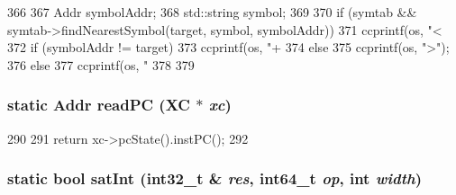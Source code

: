 \begin{DoxyCode}
366 {
367     Addr symbolAddr;
368     std::string symbol;
369 
370     if (symtab && symtab->findNearestSymbol(target, symbol, symbolAddr)) {
371         ccprintf(os, "<%
372         if (symbolAddr != target)
373             ccprintf(os, "+%
374         else
375             ccprintf(os, ">");
376     } else {
377         ccprintf(os, "%
378     }
379 }
\end{DoxyCode}
\hypertarget{classArmISA_1_1ArmStaticInst_a8895f5e6ea72acdc881a4a2811d8061d}{
\subsubsection[{readPC}]{\setlength{\rightskip}{0pt plus 5cm}static {\bf Addr} readPC (XC $\ast$ {\em xc})}}
\label{classArmISA_1_1ArmStaticInst_a8895f5e6ea72acdc881a4a2811d8061d}



\begin{DoxyCode}
290     {
291         return xc->pcState().instPC();
292     }
\end{DoxyCode}
\hypertarget{classArmISA_1_1ArmStaticInst_acd2842ccffb92bb276c016c87155bc67}{
\subsubsection[{satInt}]{\setlength{\rightskip}{0pt plus 5cm}static bool satInt (int32\_\-t \& {\em res}, \/  int64\_\-t {\em op}, \/  int {\em width})}}
\label{classArmISA_1_1ArmStaticInst_acd2842ccffb92bb276c016c87155bc67}



